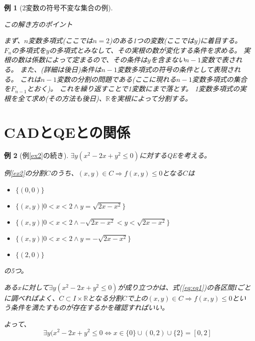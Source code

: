 \documentclass[a4j, 12pt]{jsarticle}
\theoremstyle{break}
\newtheorem{Example}{例}[section]
\begin{document}
\begin{Example}[2変数の符号不変な集合の例]
\begin{framed}
\begin{center}
この解き方のポイント
\end{center}
まず、$n$変数多項式(ここでは$n=2$)のある1つの変数(ここでは$y$)に着目する。
$F_n$の多項式を$y$の多項式とみなして、その実根の数が変化する条件を求める。
実根の数は係数によって定まるので、その条件は$y$を含まない$n-1$変数で表される。
また、(詳細は後日)条件は$n-1$変数多項式の符号の条件として表現される。
これは$n-1$変数の分割の問題である(ここに現れる$n-1$変数多項式の集合を$F_{n-1}$とおく)。
これを繰り返すことで1変数にまで落とす。
1変数多項式の実根を全て求め(その方法も後日)、$\mathbb{R}$を実根によって分割する。
\end{framed}
\end{Example}

\section{CADとQEとの関係}
\begin{Example}[例\ref{ex2}の続き]
$\exists y(x^2-2x+y^2 \le 0)$に対するQEを考える。

例\ref{ex2}の分割$C$のうち、$(x, y) \in C \Rightarrow f(x, y) \le 0$となる$C$は
\begin{itemize}
 \item $\{(0,0) \}$
 \item $\{(x, y) | 0 < x < 2 \wedge y = \sqrt{2x-x^2}\}$
 \item $\{(x, y) | 0 < x < 2 \wedge -\sqrt{2x-x^2} < y < \sqrt{2x-x^2}\}$
 \item $\{(x, y) | 0 < x < 2 \wedge y = -\sqrt{2x-x^2}\}$
 \item $\{ (2, 0) \}$
\end{itemize}
の5つ。

ある$x$に対して$\exists y(x^2-2x+y^2 \le 0)$が成り立つかは、式(\ref{eq:eq1})の各区間$I$ごとに調べればよく、$C \subset I \times \mathbb{R}$となる分割$C$で上の$(x, y) \in C \Rightarrow f(x, y) \le 0$という条件を満たすものが存在するかを確認すればいい。

よって、
\[\exists y(x^2-2x+y^2 \le 0 \Leftrightarrow x \in \{ 0 \} \cup (0, 2) \cup \{ 2 \} = [0, 2]\]
\end{Example}

\end{document}
